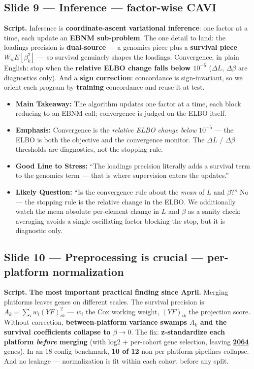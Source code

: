\documentclass[11pt]{article}
\newcommand{\scriptlabel}{\textbf{Script. }}
\newcommand{\sectionlabel}[1]{\textbf{#1}}
\newcommand{\key}[1]{\textcolor{keyblue}{\textbf{#1}}}        %
\newcommand{\num}[1]{\textcolor{keycar}{\textbf{\uline{#1}}}} %
\begin{document}
\subsection*{Slide 9 --- Inference --- factor-wise CAVI}
\scriptlabel Inference is \key{coordinate-ascent variational inference}: one factor at a time, each
update an \key{EBNM sub-problem}. The one detail to land: the loadings precision is
\key{dual-source} --- a genomics piece plus a \key{survival piece $W_{ii}E[\beta_k^2]$} --- so
survival genuinely shapes the loadings. Convergence, in plain English: stop when the \key{relative
ELBO change falls below $10^{-5}$} ($\Delta L$, $\Delta\beta$ are diagnostics only). And a
\key{sign correction}: concordance is sign-invariant, so we orient each program by \key{training}
concordance and reuse it at test.

\begin{itemize}
\item \sectionlabel{Main Takeaway:} The algorithm updates one factor at a time, each block reducing
to an EBNM call; convergence is judged on the ELBO itself.
\item \sectionlabel{Emphasis:} Convergence is the \emph{relative ELBO change below $10^{-5}$} --- the
ELBO is both the objective and the convergence monitor. The $\Delta L$ / $\Delta\beta$ thresholds are
diagnostics, not the stopping rule.
\item \sectionlabel{Good Line to Stress:} ``The loadings precision literally adds a survival term to
the genomics term --- that is where supervision enters the updates.''
\item \sectionlabel{Likely Question:} ``Is the convergence rule about the \emph{mean} of $L$ and
$\beta$?'' No --- the stopping rule is the relative change in the ELBO. We additionally watch the
mean absolute per-element change in $L$ and $\beta$ as a sanity check; averaging avoids a single
oscillating factor blocking the stop, but it is diagnostic only.
\end{itemize}

\subsection*{Slide 10 --- Preprocessing is crucial --- per-platform normalization}
\scriptlabel \key{The most important practical finding since April.} Merging platforms leaves genes
on different scales. The survival precision is $A_k = \sum_i w_i (YF)_{ik}^2$ --- $w_i$ the Cox
working weight, $(YF)_{ik}$ the projection score. Without correction, \key{between-platform variance
swamps $A_k$ and the survival coefficients collapse to $\beta \to 0$}. The fix: \key{z-standardize
each platform \emph{before} merging} (with log2 + per-cohort gene selection, leaving \num{2064}
genes). In an 18-config benchmark, \key{10 of 12} non-per-platform pipelines collapse. And no
leakage --- normalization is fit within each cohort before any split.
\end{document}
